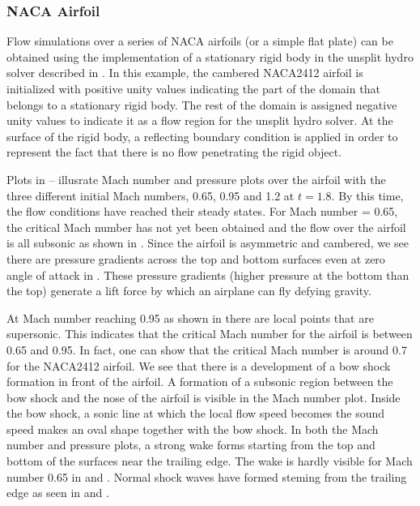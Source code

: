 \subsubsection{NACA Airfoil}
\label{Sec:SimulationFlatPlate}
Flow simulations over a series of NACA airfoils (or a simple flat plate) can be obtained using the 
implementation of a stationary rigid body in the unsplit hydro solver described in .
In this example, the cambered NACA2412 airfoil is initialized 
with positive unity values indicating the part of the domain that
belongs to a stationary rigid body. The rest of the domain is assigned negative unity values to indicate it as
a flow region for the unsplit hydro solver.
At the surface of the rigid body, a reflecting boundary condition is applied in order to represent the fact that there is
no flow penetrating the rigid object.

Plots in  --  illusrate 
Mach number and pressure plots over the airfoil with the three different initial Mach numbers, 0.65, 0.95 and 1.2 at $t=1.8.$ 
By this time, the flow conditions have reached their steady states. For Mach number = 0.65, the critical Mach number has not yet
been obtained and the flow over the airfoil is all subsonic as shown in . Since the airfoil is
asymmetric and cambered, we see there are pressure gradients across the top and bottom surfaces 
even at zero angle of attack in . 
These pressure gradients (higher pressure at the bottom than the top) generate a lift force 
by which an airplane can fly defying gravity. 

At Mach number reaching 0.95 as shown in  there are local points 
that are supersonic. This indicates that the critical Mach number for the airfoil is between 
0.65 and 0.95. In fact, one can show that the critical Mach number is around 0.7 for the NACA2412 airfoil.
We see that there is a development of a bow shock formation in front of the airfoil. 
A formation of a subsonic region between the bow shock
and the nose of the airfoil is visible in the Mach number plot. Inside the bow shock, a sonic line at which
the local flow speed becomes the sound speed makes an oval shape together with the bow shock.   
In both the Mach number and pressure plots, a strong wake forms starting from 
the top and bottom of the surfaces near the trailing edge.
The wake is hardly visible for Mach number 0.65 in  and .
Normal shock waves have formed steming from the trailing edge as seen in  and
.

